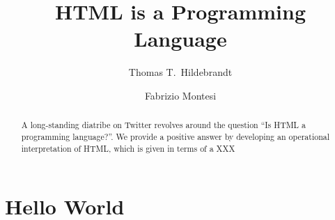\documentclass[a4paper,10pt]{article}
\title{HTML is a Programming Language}
\author{Thomas T.\ Hildebrandt \and Fabrizio Montesi}
\begin{document}
\maketitle

\begin{abstract}
A long-standing diatribe on Twitter revolves around the question ``Is HTML a programming language?''. We provide a positive answer by developing an operational interpretation of HTML, which is given in terms of a XXX
\end{abstract}

\section{Hello World}
\end{document}
